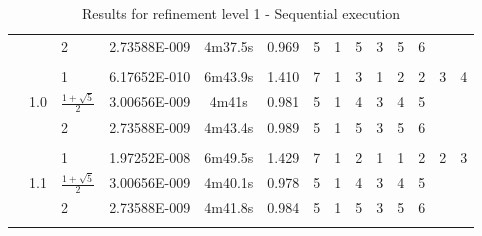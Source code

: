 \begin{sidewaystable}[p]
\begin{tabular}{l c p{2cm}| c c c c c c c c c c c}
 & & 2 & 2.73588E-009 & 4m37.5s & 0.969 & 5 & 1 & 5 & 3 & 5 & 6\\
 & & & & \\
  \hline
  & & 1 & 6.17652E-010 & 6m43.9s & 1.410 & 7 & 1 & 3 & 1 & 2 & 2 & 3 & 4\\
& 1.0 & $ \frac{1 + \sqrt{5}}{2} $ &
3.00656E-009 & 4m41s & 0.981 & 5 & 1 & 4 & 3 & 4 & 5\\
 & & 2 & 2.73588E-009 & 4m43.4s & 0.989 & 5 & 1 & 5 & 3 & 5 & 6\\
 & & & & \\
  \hline
  & & 1 & 1.97252E-008 & 6m49.5s & 1.429 & 7 & 1 & 2 & 1 & 1 & 2 & 2 & 3\\
& 1.1 & $ \frac{1 + \sqrt{5}}{2} $ &
3.00656E-009 & 4m40.1s & 0.978 & 5 & 1 & 4 & 3 & 4 & 5\\
 & & 2 & 2.73588E-009 & 4m41.8s & 0.984 & 5 & 1 & 5 & 3 & 5 & 6\\ 
  & & & & \\ \hline 
\end{tabular}


\caption{ Results for refinement level 1 - Sequential execution}

\end{sidewaystable}



